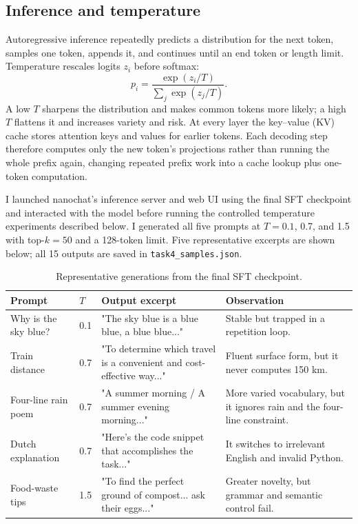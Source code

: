 \documentclass{article}
\begin{document}
\subsection{Inference and temperature}

Autoregressive inference repeatedly predicts a distribution for the next
token, samples one token, appends it, and continues until an end token or length
limit. Temperature rescales logits $z_i$ before softmax:
\[
p_i = \frac{\exp(z_i/T)}{\sum_j \exp(z_j/T)}.
\]
A low $T$ sharpens the distribution and makes common tokens more likely; a high
$T$ flattens it and increases variety and risk. At every layer the key--value
(KV) cache stores attention keys and
values for earlier tokens. Each decoding step therefore computes only the new
token's projections rather than running the whole prefix again, changing
repeated prefix work into a cache lookup plus one-token computation.

I launched nanochat's inference server and web UI using the final SFT
checkpoint and interacted with the model before running the controlled
temperature experiments described below. I generated all five prompts at
$T=0.1$, 0.7, and 1.5 with top-$k=50$ and a
128-token limit. Five representative excerpts are shown below; all 15 outputs
are saved in \texttt{task4\_samples.json}.

\begin{table}[t]
\centering
\footnotesize
\caption{Representative generations from the final SFT checkpoint.}
\label{tab:task4-samples}
\begin{tabularx}{\textwidth}{@{}p{2.2cm}p{0.7cm}Yp{3.6cm}@{}}
\toprule
Prompt & $T$ & Output excerpt & Observation \\
\midrule
Why is the sky blue? & 0.1 & "The sky blue is a blue blue, a blue blue..."
& Stable but trapped in a repetition loop. \\
Train distance & 0.7 & "To determine which travel is a convenient and
cost-effective way..." & Fluent surface form, but it never computes 150 km. \\
Four-line rain poem & 0.7 & "A summer morning / A summer evening morning..."
& More varied vocabulary, but it ignores rain and the four-line constraint. \\
Dutch explanation & 0.7 & "Here's the code snippet that accomplishes the
task..." & It switches to irrelevant English and invalid Python. \\
Food-waste tips & 1.5 & "To find the perfect ground of compost... ask their
eggs..." & Greater novelty, but grammar and semantic control fail. \\
\bottomrule
\end{tabularx}
\end{table}
\end{document}
